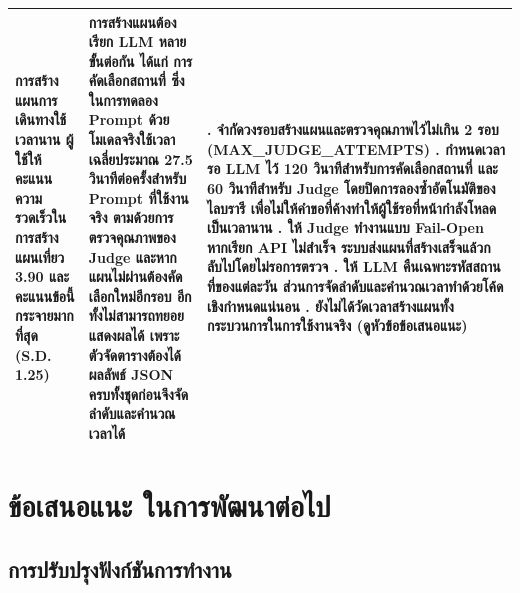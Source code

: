 {\begin{longtable}{|>{\raggedright\arraybackslash}p{2.9cm}|>{\raggedright\arraybackslash}p{4.9cm}|>{\raggedright\arraybackslash}p{5.5cm}|}
\hline
การสร้างแผนการเดินทางใช้เวลานาน ผู้ใช้ให้คะแนนความรวดเร็วในการสร้างแผนเที่ยว 3.90 และคะแนนข้อนี้กระจายมากที่สุด (S.D. 1.25) & การสร้างแผนต้องเรียก LLM หลายขั้นต่อกัน ได้แก่ การคัดเลือกสถานที่ ซึ่งในการทดลอง Prompt ด้วยโมเดลจริงใช้เวลาเฉลี่ยประมาณ 27.5 วินาทีต่อครั้งสำหรับ Prompt ที่ใช้งานจริง ตามด้วยการตรวจคุณภาพของ Judge และหากแผนไม่ผ่านต้องคัดเลือกใหม่อีกรอบ อีกทั้งไม่สามารถทยอยแสดงผลได้ เพราะตัวจัดตารางต้องได้ผลลัพธ์ JSON ครบทั้งชุดก่อนจึงจัดลำดับและคำนวณเวลาได้ & 1. จำกัดวงรอบสร้างแผนและตรวจคุณภาพไว้ไม่เกิน 2 รอบ (MAX\_JUDGE\_ATTEMPTS) \newline 2. กำหนดเวลารอ LLM ไว้ 120 วินาทีสำหรับการคัดเลือกสถานที่ และ 60 วินาทีสำหรับ Judge โดยปิดการลองซ้ำอัตโนมัติของไลบรารี เพื่อไม่ให้คำขอที่ค้างทำให้ผู้ใช้รอที่หน้ากำลังโหลดเป็นเวลานาน \newline 3. ให้ Judge ทำงานแบบ Fail-Open หากเรียก API ไม่สำเร็จ ระบบส่งแผนที่สร้างเสร็จแล้วกลับไปโดยไม่รอการตรวจ \newline 4. ให้ LLM คืนเฉพาะรหัสสถานที่ของแต่ละวัน ส่วนการจัดลำดับและคำนวณเวลาทำด้วยโค้ดเชิงกำหนดแน่นอน \newline 5. ยังไม่ได้วัดเวลาสร้างแผนทั้งกระบวนการในการใช้งานจริง (ดูหัวข้อข้อเสนอแนะ) \\
\hline
\end{longtable}
\par}

\section{ข้อเสนอแนะ ในการพัฒนาต่อไป}

\subsection{การปรับปรุงฟังก์ชันการทำงาน}

